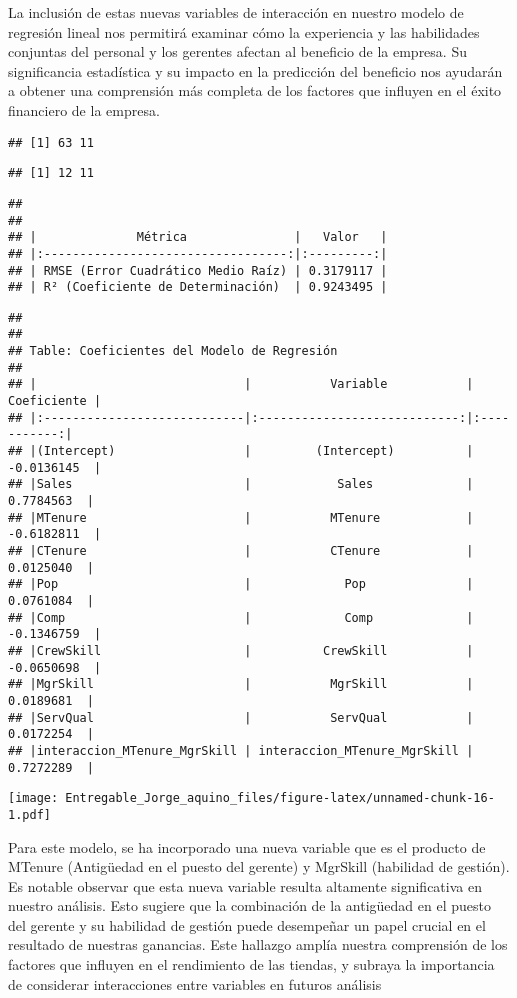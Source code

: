 \documentclass[
]{article}
\begin{document}
La inclusión de estas nuevas variables de interacción en nuestro modelo
de regresión lineal nos permitirá examinar cómo la experiencia y las
habilidades conjuntas del personal y los gerentes afectan al beneficio
de la empresa. Su significancia estadística y su impacto en la
predicción del beneficio nos ayudarán a obtener una comprensión más
completa de los factores que influyen en el éxito financiero de la
empresa.

\begin{verbatim}
## [1] 63 11
\end{verbatim}

\begin{verbatim}
## [1] 12 11
\end{verbatim}

\begin{verbatim}
## 
## 
## |              Métrica               |   Valor   |
## |:----------------------------------:|:---------:|
## | RMSE (Error Cuadrático Medio Raíz) | 0.3179117 |
## | R² (Coeficiente de Determinación)  | 0.9243495 |
\end{verbatim}

\begin{verbatim}
## 
## 
## Table: Coeficientes del Modelo de Regresión
## 
## |                             |           Variable           | Coeficiente |
## |:----------------------------|:----------------------------:|:-----------:|
## |(Intercept)                  |         (Intercept)          | -0.0136145  |
## |Sales                        |            Sales             |  0.7784563  |
## |MTenure                      |           MTenure            | -0.6182811  |
## |CTenure                      |           CTenure            |  0.0125040  |
## |Pop                          |             Pop              |  0.0761084  |
## |Comp                         |             Comp             | -0.1346759  |
## |CrewSkill                    |          CrewSkill           | -0.0650698  |
## |MgrSkill                     |           MgrSkill           |  0.0189681  |
## |ServQual                     |           ServQual           |  0.0172254  |
## |interaccion_MTenure_MgrSkill | interaccion_MTenure_MgrSkill |  0.7272289  |
\end{verbatim}

\texttt{[image: Entregable\_Jorge\_aquino\_files/figure-latex/unnamed-chunk-16-1.pdf]}

Para este modelo, se ha incorporado una nueva variable que es el
producto de MTenure (Antigüedad en el puesto del gerente) y MgrSkill
(habilidad de gestión). Es notable observar que esta nueva variable
resulta altamente significativa en nuestro análisis. Esto sugiere que la
combinación de la antigüedad en el puesto del gerente y su habilidad de
gestión puede desempeñar un papel crucial en el resultado de nuestras
ganancias. Este hallazgo amplía nuestra comprensión de los factores que
influyen en el rendimiento de las tiendas, y subraya la importancia de
considerar interacciones entre variables en futuros análisis
\end{document}
